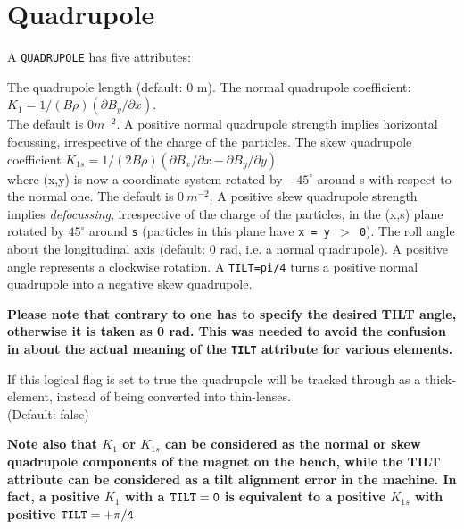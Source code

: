 \section{Quadrupole}
\label{sec:quadrupole}



A {\tt QUADRUPOLE} has five attributes:     
\begin{madlist}
    The quadrupole length (default: 0 m). 
    The normal quadrupole coefficient:        
     $K_1 = 1/(B \rho) (\partial B_y / \partial x)$.\\ 
     The default is $0 m^{-2}$. A positive normal quadrupole strength
     implies horizontal focussing, irrespective of the charge of the particles.
    The skew quadrupole coefficient 
     $K_{1s} = 1/(2 B \rho) (\partial B_x / \partial x - \partial B_y / \partial y)$\\  
     where (x,y) is now a coordinate system rotated by $-45^\circ$ around s
     with respect to the normal one. The default is $0\ m^{-2}$. A
     positive skew quadrupole strength implies {\sl defocussing}, 
     irrespective of the charge of the particles,  
     in the (x,s) plane rotated by $45^\circ$
     around {\tt s} (particles in this plane have {\tt x = y $>$ 0}). 
    The roll angle about the longitudinal axis (default: 0
     rad, i.e. a normal quadrupole). A positive angle represents a
     clockwise rotation. A {\tt TILT=pi/4} turns a positive normal quadrupole
     into a negative skew quadrupole.          

\textbf{Please note that contrary to \madeight one has to
  specify the desired TILT angle, otherwise it is taken as
  0 rad. This was needed to avoid the confusion in \madeight
  about the actual meaning of the {\tt TILT} attribute for
  various elements. } 

     If this logical flag is set to true the quadrupole
    will be tracked through as a thick-element, instead of being
    converted into thin-lenses.\\
    (Default: false)
\end{madlist}

\textbf{Note also that $K_1$ or $K_{1s}$ can be considered as
  the normal or skew quadrupole components of the magnet on
  the bench, while the TILT attribute can be considered as a
  tilt alignment error in the machine. In fact, a positive
  $K_1$ with a $\tt{TILT} = 0$ is equivalent to a positive $K_{1s}$
  with positive $\tt{TILT} = +\pi/4$ } 

